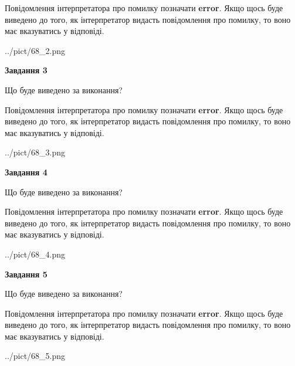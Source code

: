 \documentclass[12pt, ukrainian]{article}
\begin{document}
{\begin {large}
Повідомлення інтерпретатора про помилку позначати \textbf{error}.
Якщо щось буде виведено до того, як інтерпретатор видасть повідомлення про помилку, 
то воно має вказуватись у відповіді. \par


\begin{center}
	{../pict/68_2.png}
\end{center}
\newpage

{\begin {center}\textbf{Завдання 3}\end {center}}\par
Що буде виведено за виконання?

Повідомлення інтерпретатора про помилку позначати \textbf{error}.
Якщо щось буде виведено до того, як інтерпретатор видасть повідомлення про помилку, 
то воно має вказуватись у відповіді. \par


\begin{center}
	{../pict/68_3.png}
\end{center}
\newpage

{\begin {center}\textbf{Завдання 4}\end {center}}\par
Що буде виведено за виконання?

Повідомлення інтерпретатора про помилку позначати \textbf{error}.
Якщо щось буде виведено до того, як інтерпретатор видасть повідомлення про помилку, 
то воно має вказуватись у відповіді. \par


\begin{center}
	{../pict/68_4.png}
\end{center}
\newpage

{\begin {center}\textbf{Завдання 5}\end {center}}\par
Що буде виведено за виконання?

Повідомлення інтерпретатора про помилку позначати \textbf{error}.
Якщо щось буде виведено до того, як інтерпретатор видасть повідомлення про помилку, 
то воно має вказуватись у відповіді. \par


\begin{center}
	{../pict/68_5.png}
\end{center}
\newpage


\end{large}}
\end{document}
